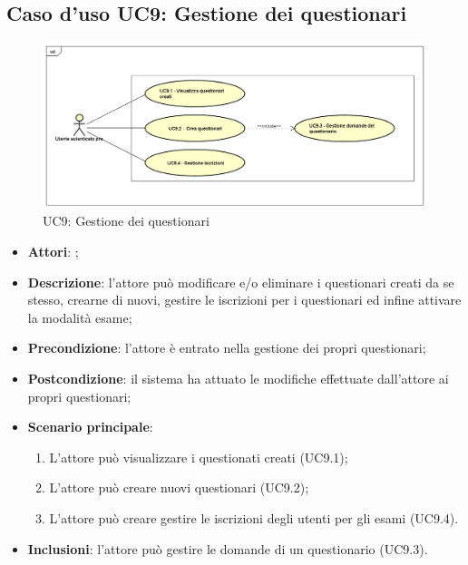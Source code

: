 \newpage
\subsection{Caso d'uso UC9: Gestione dei questionari}
\label{UC9}
\begin{figure}[h]
	\centering
	\includegraphics[scale=0.5,keepaspectratio]{UML/UC9.png}
	\caption{UC9: Gestione dei questionari}
\end{figure}
\FloatBarrier
\begin{itemize}
	\item \textbf{Attori}: \uaupro{};
	\item \textbf{Descrizione}: l'attore può modificare e/o eliminare i questionari creati da se stesso, crearne di nuovi, gestire le iscrizioni per i questionari ed infine attivare la modalità esame; 
	\item \textbf{Precondizione}: l'attore è entrato nella gestione dei propri questionari;
	\item \textbf{Postcondizione}: il sistema ha attuato le modifiche effettuate dall'attore ai propri questionari;
	\item \textbf{Scenario principale}:
		\begin{enumerate}
			\item L'attore può visualizzare i questionati creati (UC9.1);
			\item L'attore può creare nuovi questionari (UC9.2);
			\item L'attore può creare gestire le iscrizioni degli utenti per gli esami (UC9.4).
		\end{enumerate}
		\item \textbf{Inclusioni}: l'attore può gestire le domande di un questionario (UC9.3).		
\end{itemize}
							
